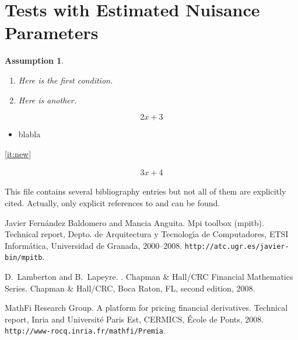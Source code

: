 \documentclass{article}
\newtheorem{ass}{Assumption}
\begin{document}
\section{Tests with Estimated Nuisance Parameters}
\label{sec:testWithPihat}

\begin{ass}
  \label{ass:C}
  \begin{enumerate}
  \item\label{ass:C:First} Here is the first condition.
  \item\label{ass:C:Second} Here is another.
  \end{enumerate}
\end{ass}

\begin{equation*}
  2x +3
\end{equation*}

\begin{itemize}
\item \label{it:new} blabla
\end{itemize}

\ref{it:new}

\begin{multline}
  \label{mult}
  3x + 4
\end{multline}

This file contains several bibliography entries but not all of them are
explicitly cited. Actually, only explicit references to \cite{mpitb} and
\cite{lambertonlapeyre} can be found.

\begin{thebibliography}{X}
  {Javier Fern\'andez Baldomero and Mancia Anguita}.
  \newblock Mpi toolbox (mpitb).
  \newblock Technical report, Depto. de Arquitectura y Tecnolog\'{\i}a de
  Computadores, ETSI Inform\'atica, Universidad de Granada, 2000--2008.
  \newblock \verb!http://atc.ugr.es/javier-bin/mpitb!.

  D.~Lamberton and B.~Lapeyre.
  .
  \newblock Chapman \& Hall/CRC Financial Mathematics Series. Chapman \&
  Hall/CRC, Boca Raton, FL, second edition, 2008.

  {MathFi Research Group}.
  \newblock A platform for pricing financial derivatives.
  \newblock Technical report, Inria and Universit\'e Paris Est, CERMICS, \'Ecole de
  Ponts, 2008.
  \newblock \verb!http://www-rocq.inria.fr/mathfi/Premia!.
\end{thebibliography}
\end{document}

